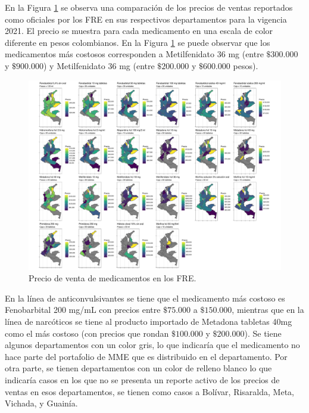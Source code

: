 \documentclass[
  oneside]{book}
\begin{document}
En la Figura \ref{fig:precioVentasDepartamentos} se observa una comparación de los precios de ventas reportados como oficiales por los FRE en sus respectivos departamentos para la vigencia 2021. El precio se muestra para cada medicamento en una escala de color diferente en pesos colombianos. En la Figura \ref{fig:precioVentasDepartamentos} se puede observar que los medicamentos más costosos corresponden a Metilfenidato 36 mg (entre \(\$300.000\) y \(\$900.000\)) y Metilfenidato 36 mg (entre \(\$200.000\) y \(\$600.000\) pesos).

\begin{figure}[t!]
\includegraphics[width=1\linewidth]{InformeFinal_files/figure-latex/precioVentasDepartamentos-1} \caption{Precio de venta de medicamentos en los FRE.}\label{fig:precioVentasDepartamentos}
\end{figure}

En la línea de anticonvulsivantes se tiene que el medicamento más costoso es Fenobarbital 200 mg/mL con precios entre \(\$75.000\) a \(\$150.000\), mientras que en la línea de narcóticos se tiene al producto importado de Metadona tabletas 40mg como el más costoso (con precios que rondan \(\$100.000\) y \(\$200.000\)). Se tiene algunos departamentos con un color gris, lo que indicaría que el medicamento no hace parte del portafolio de MME que es distribuido en el departamento. Por otra parte, se tienen departamentos con un color de relleno blanco lo que indicaría casos en los que no se presenta un reporte activo de los precios de ventas en esos departamentos, se tienen como casos a Bolívar, Risaralda, Meta, Vichada, y Guainía.
\end{document}
